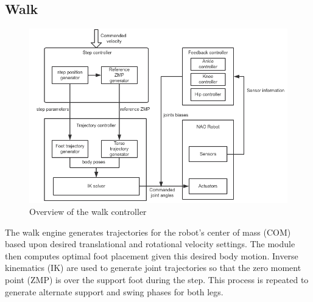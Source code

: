 \documentclass{article}
\begin{document}
\subsection{Walk}
	\begin{figure}[H]
		\centering
		\includegraphics[width=1\textwidth]{figures/WalkOverView.png}
		\caption{Overview of the walk controller}
	\end{figure}
The walk engine generates trajectories for the robot's center of mass (COM) based upon desired translational and rotational velocity settings. The module then computes optimal foot placement given this desired body motion. Inverse kinematics (IK) are used to generate joint trajectories so that the zero moment point (ZMP) is over the support foot during the step. This process is repeated to generate alternate support and swing phases for both legs.
\end{document}

